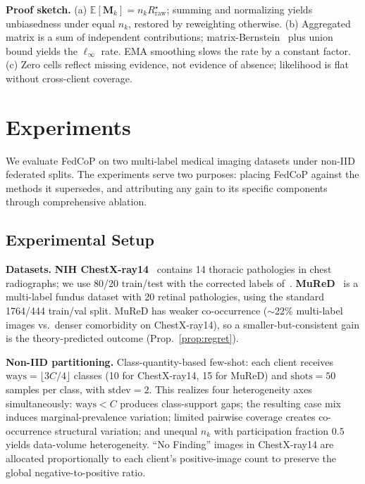 \documentclass[conference]{IEEEtran}
\theoremstyle{definition}
\begin{document}
\noindent\textbf{Proof sketch.} (a) $\mathbb{E}[\mathbf{M}_k]{=}n_k R^{\star}_{\mathrm{raw}}$; summing and normalizing yields unbiasedness under equal $n_k$, restored by reweighting otherwise. (b) Aggregated matrix is a sum of independent contributions; matrix-Bernstein~\cite{tropp2015matrix} plus union bound yields the $\ell_\infty$ rate. EMA smoothing slows the rate by a constant factor. (c) Zero cells reflect missing evidence, not evidence of absence; likelihood is flat without cross-client coverage. 

\section{Experiments}
\label{sec:experiments}

We evaluate FedCoP on two multi-label medical imaging datasets under non-IID federated splits. The experiments serve two purposes: placing FedCoP against the methods it supersedes, and attributing any gain to its specific components through comprehensive ablation.

\subsection{Experimental Setup}

\noindent\textbf{Datasets.} \textbf{NIH ChestX-ray14}~\cite{wang2017chestxray8,jaeger2023chestxray} contains 14 thoracic pathologies in chest radiographs; we use 80/20 train/test with the corrected labels of~\cite{jaeger2023chestxray}. \textbf{MuReD}~\cite{caro2022mured} is a multi-label fundus dataset with 20 retinal pathologies, using the standard 1764/444 train/val split. MuReD has weaker co-occurrence ($\sim$22\% multi-label images vs.\ denser comorbidity on ChestX-ray14), so a smaller-but-consistent gain is the theory-predicted outcome (Prop.~\ref{prop:regret}).

\noindent\textbf{Non-IID partitioning.} Class-quantity-based few-shot: each client receives $\text{ways}{=}\lfloor 3C/4\rfloor$ classes (10 for ChestX-ray14, 15 for MuReD) and $\text{shots}{=}50$ samples per class, with $\text{stdev}{=}2$. This realizes four heterogeneity axes simultaneously: $\text{ways}{<}C$ produces class-support gaps; the resulting case mix induces marginal-prevalence variation; limited pairwise coverage creates co-occurrence structural variation; and unequal $n_k$ with participation fraction $0.5$ yields data-volume heterogeneity. ``No Finding'' images in ChestX-ray14 are allocated proportionally to each client's positive-image count to preserve the global negative-to-positive ratio.
\end{document}

